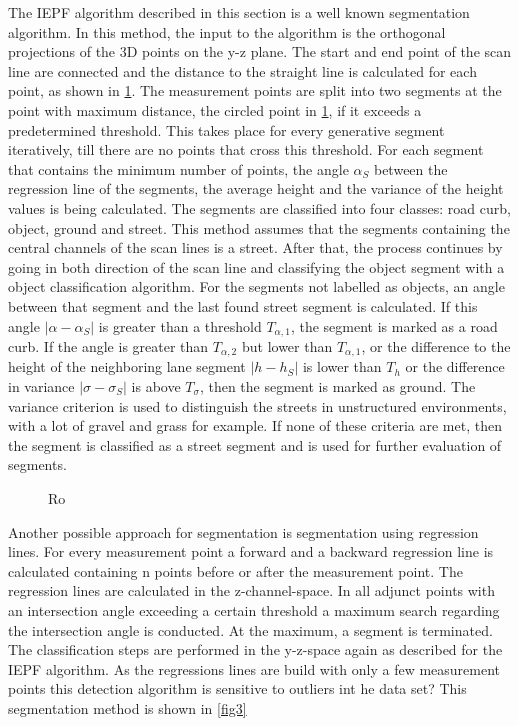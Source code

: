 \documentclass[conference]{IEEEtran}
\begin{document}
The IEPF algorithm described in this section is a well known segmentation algorithm. In this method, the input to the algorithm is the orthogonal projections of the 3D points on the y-z plane. The start and end point of the scan line are connected and the distance to the straight line is calculated for each point, as shown in \ref{fig2}. The measurement points are split into two segments at the point with maximum distance, the circled point in \ref{fig2}, if it exceeds a predetermined threshold. This takes place for every generative segment iteratively, till there are no points that cross this threshold. For each segment that contains the minimum number of points, the angle $\alpha_S$ between the regression line of the segments, the average height and the variance of the height values is being calculated. The segments are classified into four classes: road curb, object, ground and street. This method assumes that the segments containing the central channels of the scan lines is a street. After that, the process continues by going in both direction of the scan line and classifying the object segment with a object classification algorithm. For the segments not labelled as objects, an angle between that segment and the last found street segment is calculated. If this angle $|\alpha - \alpha_S|$ is greater than a threshold $T_{\alpha,1}$, the segment is marked as a road curb. If the angle is greater than $T_{\alpha,2}$ but lower than $T_{\alpha,1}$, or the difference to the height of the neighboring lane segment $|h - h_S|$ is lower than $T_h$ or the difference in variance $|\sigma - \sigma_S|$ is above $T_\sigma$, then the segment is marked as ground. The variance criterion is used to distinguish the streets in unstructured environments, with a lot of gravel and grass for example. If none of these criteria are met, then the segment is classified as a street segment and is used for further evaluation of segments. 

\begin{figure}[ht]
	\centering
	\caption{Ro}
	\label{fig2}
\end{figure}
 

Another possible approach for segmentation is segmentation using regression lines. For every measurement point a forward and a backward regression line is calculated containing n points before or after the measurement point. The regression lines are calculated in the z-channel-space.  In all adjunct points with an intersection angle exceeding a certain threshold a maximum search regarding the intersection angle is conducted. At the maximum, a segment is terminated. The classification steps are performed in the y-z-space again as described for the IEPF algorithm. As the regressions lines are build with only a few measurement points this detection algorithm is sensitive to outliers int he data set? This segmentation method is shown in \ref{fig3}
\end{document}
